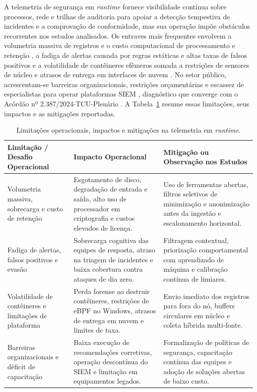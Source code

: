 A telemetria de segurança em \textit{runtime} fornece visibilidade contínua sobre processos, rede e trilhas de auditoria para apoiar a detecção tempestiva de incidentes e a comprovação de conformidade, mas sua operação impõe obstáculos recorrentes nos estudos analisados. Os entraves mais frequentes envolvem a volumetria massiva de registros e o custo computacional de processamento e retenção \cite{albuquerque2024,portillo2019,velasquez2025,shao2026a}, a fadiga de alertas causada por regras estáticas e altas taxas de falsos positivos \cite{joshisabhaya2026,zhang2025,aftab2026} e a volatilidade de contêineres efêmeros somada a restrições de sensores de núcleo e atrasos de entrega em interfaces de nuvem \cite{jin2025,torkura2021,darwesh2024}. No setor público, acrescentam-se barreiras organizacionais, restrições orçamentárias e escassez de especialistas para operar plataformas SIEM \cite{enaw2018,acosta2025,bungei2026}, diagnóstico que converge com o Acórdão nº 2.387/2024-TCU-Plenário \cite{tcu2387_2024}. A Tabela~\ref{tab:rsl_qs11} resume essas limitações, seus impactos e as mitigações reportadas.

\begin{table}[!htbp]
    \centering
    \caption{Limitações operacionais, impactos e mitigações na telemetria em \textit{runtime}.}
    \label{tab:rsl_qs11}
    \footnotesize
    \begin{tabular}{p{3.4cm}p{4.8cm}p{5.8cm}}
        \hline
        \textbf{Limitação / Desafio Operacional} & \textbf{Impacto Operacional} & \textbf{Mitigação ou Observação nos Estudos} \\ \hline
        Volumetria massiva, sobrecarga e custo de retenção & Esgotamento de disco, degradação de entrada e saída, alto uso de processador em criptografia e custos elevados de licença. & Uso de ferramentas abertas, filtros seletivos de minimização e anonimização antes da ingestão e escalonamento horizontal. \\ \hline
        Fadiga de alertas, falsos positivos e evasão & Sobrecarga cognitiva das equipes de resposta, atraso na triagem de incidentes e baixa cobertura contra ataques de dia zero. & Filtragem contextual, priorização comportamental com aprendizado de máquina e calibração contínua de limiares. \\ \hline
        Volatilidade de contêineres e limitações de plataforma & Perda forense ao destruir contêineres, restrições de eBPF no Windows, atrasos de entrega em nuvem e limites de taxa. & Envio imediato dos registros para fora do nó, buffers circulares em núcleo e coleta híbrida multi-fonte. \\ \hline
        Barreiras organizacionais e déficit de capacitação & Baixa execução de recomendações corretivas, operação descontínua do SIEM e limitação em equipamentos legados. & Formalização de políticas de segurança, capacitação contínua das equipes e adoção de soluções abertas de baixo custo. \\ \hline
    \end{tabular}
\end{table}
\FloatBarrier

